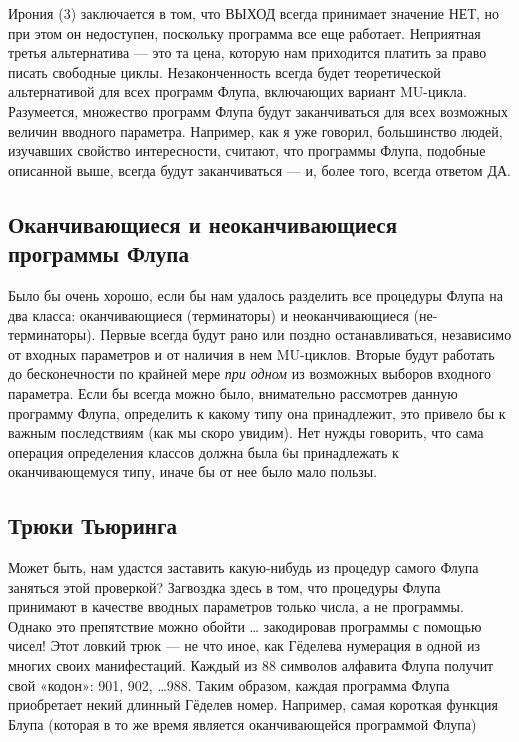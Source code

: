 \documentclass[../main.tex]{subfiles}
\begin{document}
Ирония (3) заключается в том, что ВЫХОД всегда принимает значение НЕТ, но при этом он недоступен, поскольку программа все еще работает. Неприятная третья альтернатива --- это та цена, которую нам приходится платить за право писать свободные циклы. Незаконченность всегда будет теоретической альтернативой для всех программ Флупа, включающих вариант MU-цикла. Разумеется, множество программ Флупа будут заканчиваться для всех возможных величин вводного параметра. Например, как я уже говорил, большинство людей, изучавших свойство интересности, считают, что программы Флупа, подобные описанной выше, всегда будут заканчиваться --- и, более того, всегда ответом ДА.


\subsection{Оканчивающиеся и неоканчивающиеся программы Флупа}

Было бы очень хорошо, если бы нам удалось разделить все процедуры Флупа на два класса: оканчивающиеся (терминаторы) и неоканчивающиеся (не-терминаторы). Первые всегда будут рано или поздно останавливаться, независимо от входных параметров и от наличия в нем MU-циклов. Вторые будут работать до бесконечности по крайней мере \emph{при одном} из возможных выборов входного параметра. Если бы всегда можно было, внимательно рассмотрев данную программу Флупа, определить к какому типу она принадлежит, это привело бы к важным последствиям (как мы скоро увидим). Нет нужды говорить, что сама операция определения классов должна была 6ы принадлежать к оканчивающемуся типу, иначе бы от нее было мало пользы.


\subsection{Трюки Тьюринга}

Может быть, нам удастся заставить какую-нибудь из процедур самого Флупа заняться этой проверкой? Загвоздка здесь в том, что процедуры Флупа принимают в качестве вводных параметров только числа, а не программы. Однако это препятствие можно обойти \ldots{} закодировав программы с помощью чисел! Этот ловкий трюк --- не что иное, как Гёделева нумерация в одной из многих своих манифестаций. Каждый из 88 символов алфавита Флупа получит свой «кодон»: 901, 902, \ldots988. Таким образом, каждая программа Флупа приобретает некий длинный Гёделев номер. Например, самая короткая функция Блупа (которая в то же время является оканчивающейся программой Флупа)
\end{document}
